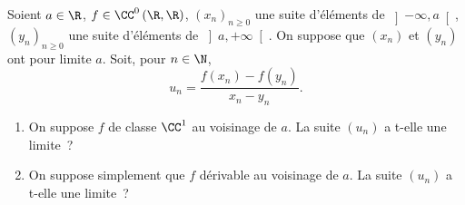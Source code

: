 \begin{enonce}
\begin{exercise}[ID={RMS123 E839, Centrale PSI},subtitle={Centrale PSI},tags={mpsi}, difficulty={0}]
Soient $a\in\R$, $f\in\CC^0\left( \R,\R \right)$,   $\left( x_n \right)_{n\geq0}$ une suite d'éléments de $\left]-\infty,a\right[$, $\left( y_n \right)_{n\geq0}$ une suite d'éléments de $\left]a,+\infty\right[$.
On suppose que $\left( x_n \right)$ et $\left( y_n \right)$ ont pour limite $a$.
Soit, pour $n\in\N$,
\begin{equation*}
  u_n=\frac{f(x_n)-f(y_n)}{x_n-y_n}.
\end{equation*}
\begin{enumerate}
  \item On suppose $f$ de classe $\CC^1$ au voisinage de $a$.
    La suite $\left( u_n \right)$ a t-elle une limite~?
  \item On suppose simplement que $f$ dérivable au voisinage de $a$.
    La suite $\left( u_n \right)$ a t-elle une limite~?
\end{enumerate}
\end{exercise}
\begin{solution}
\end{solution}
\end{enonce}
